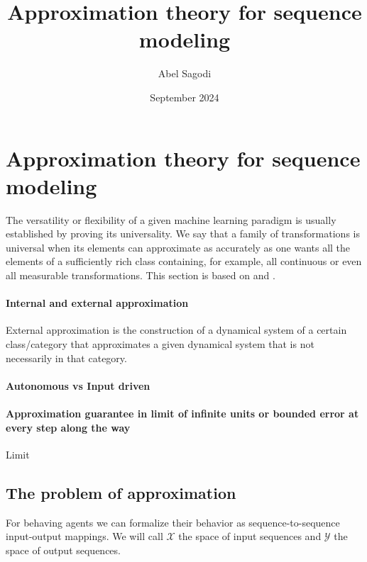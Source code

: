 \documentclass{article}
\title{Approximation theory for sequence modeling}
\author{Abel Sagodi}
\date{September 2024}
\theoremstyle{definition}
\theoremstyle{remark}
\begin{document}
\maketitle


\section{Approximation theory for sequence modeling}

The versatility or flexibility of a given machine learning paradigm is usually established by proving its universality. We say that a family of transformations is universal when its elements can approximate as accurately as one wants all the elements of a sufficiently rich class containing, for example, all continuous or even all measurable transformations.
This section is based on \citep{li2022approximation} and \citep{jiang2023brief}.



\paragraph{Internal and external approximation}
External approximation is the construction of a dynamical system of a certain class/category that approximates a given dynamical system that is not necessarily in that category.


\paragraph{Autonomous vs Input driven}

\paragraph{Approximation guarantee in limit of infinite units or bounded error at every step along the way}
Limit \citep{podlaski2024approximating}



\subsection{The problem of approximation} %
For behaving agents we can formalize their behavior as sequence-to-sequence input-output mappings.
We will call $\mathcal{X}$ the space of input sequences
and $\mathcal{Y}$ the space of output sequences.
\end{document}
